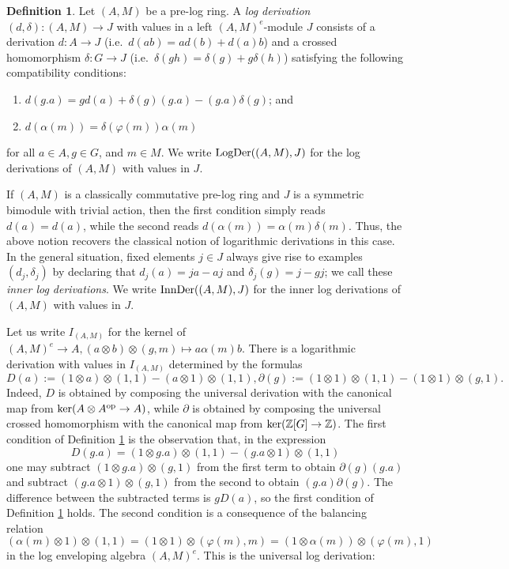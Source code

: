 \documentclass[a4paper,10pt%
]{amsart}
\numberwithin{equation}{section}
\theoremstyle{definition}
\newtheorem{definition}[subsection]{Definition}
\renewcommand{\:}{\colon}
\begin{document}
\begin{definition}\label{def:logder} Let $(A, M)$ be a pre-log ring. A \emph{log derivation} $(d, \delta) \colon (A, M) \to J$ with values in a left $(A, M)^e$-module $J$ consists of a derivation $d \colon A \to J$ (i.e.\ $d(ab) = ad(b) + d(a)b$) and a crossed homomorphism $\delta \colon G \to J$ (i.e.\  $\delta(gh) = \delta(g) + g\delta(h)$) satisfying the following compatibility conditions:

\begin{enumerate}
    \item $d(g.a) = gd(a) + \delta(g)(g.a) - (g.a)\delta(g)$; and
    \item $d(\alpha(m)) = \delta(\varphi(m))\alpha(m)$
\end{enumerate}

\noindent for all $a \in A, g \in G$, and $m \in M$. We write ${\rm LogDer}((A, M), J)$ for the log derivations of $(A, M)$ with values in $J$.
\end{definition}


If $(A, M)$ is a classically commutative pre-log ring and $J$ is a symmetric bimodule with trivial action, then the first condition simply reads $d(a) = d(a)$, while the second reads $d(\alpha(m)) = \alpha(m)\delta(m)$. Thus, the above notion recovers the classical notion of logarithmic derivations in this case. In the general situation, fixed elements $j \in J$ always give rise to examples $(d_j, \delta_j)$ by declaring that $d_j(a) = ja - aj$ and $\delta_j(g) = j - gj$; we call these \emph{inner log derivations}. We write ${\rm InnDer}((A, M), J)$ for the inner log derivations of $(A, M)$ with values in $J$. 

Let us write $I_{(A, M)}$ for the kernel of $(A, M)^e \to A, (a \otimes b) \otimes (g, m) \mapsto a \alpha(m) b$. There is a logarithmic derivation with values in $I_{(A, M)}$ determined by the formulas \[D(a) := (1 \otimes a) \otimes (1, 1) - (a \otimes 1) \otimes (1, 1), \partial(g) := (1 \otimes 1) \otimes (1, 1) - (1 \otimes 1) \otimes (g, 1).\] Indeed, $D$ is obtained by composing the universal derivation with the canonical map from ${\rm ker}(A \otimes A^{\rm op} \to A)$, while $\partial$ is obtained by composing the universal crossed homomorphism with the canonical map from ${\rm ker}({\Bbb Z}[G] \to {\Bbb Z})$. The first condition of Definition \ref{def:logder} is the observation that, in the expression \[D(g.a) = (1 \otimes g.a) \otimes (1, 1) - (g.a \otimes 1) \otimes (1, 1)\] one may subtract $(1 \otimes g.a) \otimes (g, 1)$ from the first term to obtain $\partial(g)(g.a)$ and subtract $(g.a \otimes 1) \otimes (g, 1)$ from the second to obtain $(g.a)\partial(g)$. The difference between the subtracted terms is $gD(a)$, so the first condition of Definition \ref{def:logder} holds. The second condition is a consequence of the balancing relation \[(\alpha(m) \otimes 1) \otimes (1, 1) = (1 \otimes 1) \otimes (\varphi(m), m) = (1 \otimes \alpha(m)) \otimes (\varphi(m), 1)\] in the log enveloping algebra $(A, M)^e$. This is the universal log derivation:
\end{document}
